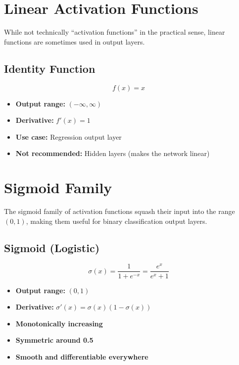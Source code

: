 \section{Linear Activation Functions}

While not technically ``activation functions'' in the practical sense, linear functions are sometimes used in output layers.

\subsection{Identity Function}

\begin{equation}
f(x) = x
\end{equation}

\begin{itemize}
    \item \textbf{Output range:} $(-\infty, \infty)$
    \item \textbf{Derivative:} $f'(x) = 1$
    \item \textbf{Use case:} Regression output layer
    \item \textbf{Not recommended:} Hidden layers (makes the network linear)
\end{itemize}

\section{Sigmoid Family}

The sigmoid family of activation functions squash their input into the range $(0, 1)$, making them useful for binary classification output layers.

\subsection{Sigmoid (Logistic)}

\begin{equation}
\sigma(x) = \frac{1}{1 + e^{-x}} = \frac{e^x}{e^x + 1}
\end{equation}

\begin{properties}
\begin{itemize}
    \item \textbf{Output range:} $(0, 1)$
    \item \textbf{Derivative:} $\sigma'(x) = \sigma(x)(1 - \sigma(x))$
    \item \textbf{Monotonically increasing}
    \item \textbf{Symmetric around 0.5}
    \item \textbf{Smooth and differentiable everywhere}
\end{itemize}
\end{properties}

